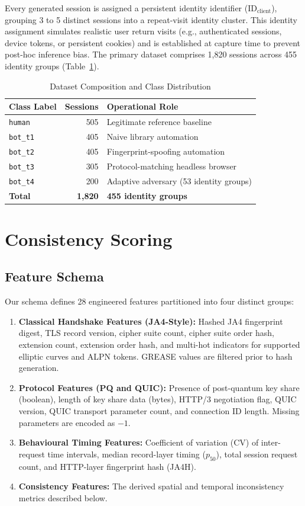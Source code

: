 \documentclass[conference]{IEEEtran}
\begin{document}
Every generated session is assigned a persistent identity identifier ($\text{ID}_{\text{client}}$), grouping 3 to 5 distinct sessions into a repeat-visit identity cluster. This identity assignment simulates realistic user return visits (e.g., authenticated sessions, device tokens, or persistent cookies) and is established at capture time to prevent post-hoc inference bias. The primary dataset comprises 1,820 sessions across 455 identity groups (Table~\ref{tab:dataset}).

\begin{table}[t]
\caption{Dataset Composition and Class Distribution}
\label{tab:dataset}
\centering
\begin{tabular}{lrl}
\toprule
\textbf{Class Label} & \textbf{Sessions} & \textbf{Operational Role} \\
\midrule
\texttt{human} & 505 & Legitimate reference baseline \\
\texttt{bot\_t1} & 405 & Naive library automation \\
\texttt{bot\_t2} & 405 & Fingerprint-spoofing automation \\
\texttt{bot\_t3} & 305 & Protocol-matching headless browser \\
\texttt{bot\_t4} & 200 & Adaptive adversary (53 identity groups) \\
\midrule
\textbf{Total} & \textbf{1,820} & \textbf{455 identity groups} \\
\bottomrule
\end{tabular}
\end{table}

\section{Consistency Scoring}

\subsection{Feature Schema}
Our schema defines 28 engineered features partitioned into four distinct groups:
\begin{enumerate}
    \item \textbf{Classical Handshake Features (JA4-Style):} Hashed JA4 fingerprint digest, TLS record version, cipher suite count, cipher suite order hash, extension count, extension order hash, and multi-hot indicators for supported elliptic curves and ALPN tokens. GREASE values \cite{rfc8701} are filtered prior to hash generation.
    \item \textbf{Protocol Features (PQ and QUIC):} Presence of post-quantum key share (boolean), length of key share data (bytes), HTTP/3 negotiation flag, QUIC version, QUIC transport parameter count, and connection ID length. Missing parameters are encoded as $-1$.
    \item \textbf{Behavioural Timing Features:} Coefficient of variation (CV) of inter-request time intervals, median record-layer timing ($p_{50}$), total session request count, and HTTP-layer fingerprint hash (JA4H).
    \item \textbf{Consistency Features:} The derived spatial and temporal inconsistency metrics described below.
\end{enumerate}
\end{document}
